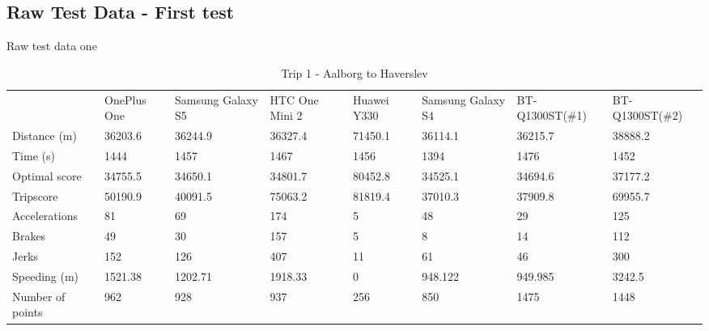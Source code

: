 \subsection*{Raw Test Data - First test}\label{app:rawtestdata1}
Raw test data one
\begin{table*}[tb]
\centering
\caption{Trip 1 - Aalborg to Haverslev}
\label{my-label}
\begin{tabular}{llllllll}
                 & OnePlus One & Samsung Galaxy S5 & HTC One Mini 2 & Huawei Y330 & Samsung Galaxy S4 & BT-Q1300ST(\#1) & BT-Q1300ST(\#2) \\
Distance (m)     & 36203.6     & 36244.9           & 36327.4        & 71450.1     & 36114.1           & 36215.7         & 38888.2         \\
Time (s)         & 1444        & 1457              & 1467           & 1456        & 1394              & 1476            & 1452            \\
Optimal score    & 34755.5     & 34650.1           & 34801.7        & 80452.8     & 34525.1           & 34694.6         & 37177.2         \\
Tripscore        & 50190.9     & 40091.5           & 75063.2        & 81819.4     & 37010.3           & 37909.8         & 69955.7         \\
Accelerations    & 81          & 69                & 174            & 5           & 48                & 29              & 125             \\
Brakes           & 49          & 30                & 157            & 5           & 8                 & 14              & 112             \\
Jerks            & 152         & 126               & 407            & 11          & 61                & 46              & 300             \\
Speeding (m)     & 1521.38     & 1202.71           & 1918.33        & 0           & 948.122           & 949.985         & 3242.5          \\
Number of points & 962         & 928               & 937            & 256         & 850               & 1475            & 1448           
\end{tabular}
\end{table*}


